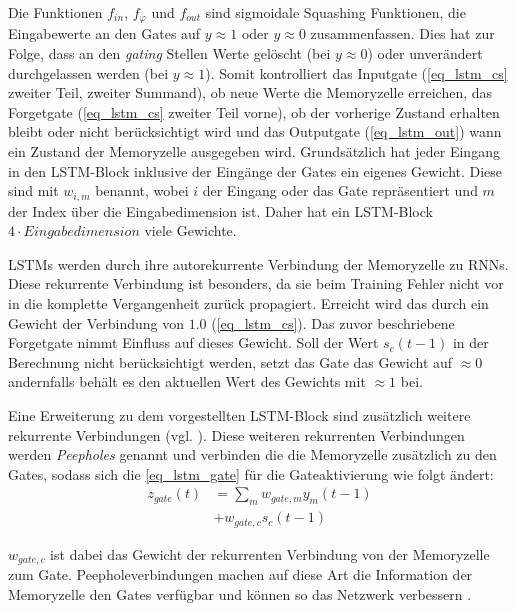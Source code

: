 Die Funktionen $f_{in}$, $f_{\varphi}$ und $f_{out}$ sind sigmoidale Squashing
Funktionen, die Eingabewerte an den Gates auf $y\approx1$ oder $y\approx0$
zusammenfassen. Dies hat zur Folge, dass an den \textit{gating} Stellen Werte
gelöscht (bei $y\approx0$) oder unverändert durchgelassen werden (bei
$y\approx1$). Somit kontrolliert das Inputgate (\autoref{eq_lstm_cs} zweiter
Teil, zweiter Summand), ob neue Werte die Memoryzelle erreichen, das Forgetgate
(\autoref{eq_lstm_cs} zweiter Teil vorne), ob der vorherige Zustand erhalten
bleibt oder nicht berücksichtigt wird und das Outputgate (\autoref{eq_lstm_out})
wann ein Zustand der Memoryzelle ausgegeben wird. Grundsätzlich hat jeder
Eingang in den \ac{LSTM}-Block inklusive der Eingänge der Gates ein eigenes
Gewicht. Diese sind mit $w_{i,m}$ benannt, wobei $i$ der Eingang oder das Gate
repräsentiert und $m$ der Index über die Eingabedimension ist. Daher hat ein
\ac{LSTM}-Block $4\cdot Eingabedimension$ viele Gewichte. 

\acp{LSTM} werden durch ihre autorekurrente Verbindung der Memoryzelle zu
\acp{RNN}. Diese rekurrente Verbindung ist besonders, da sie beim Training
Fehler nicht vor in die komplette Vergangenheit zurück propagiert. Erreicht wird
das durch ein Gewicht der Verbindung von $1.0$ (\autoref{eq_lstm_cs}). Das zuvor
beschriebene Forgetgate nimmt Einfluss auf dieses Gewicht. Soll der Wert
$s_c(t-1)$ in der Berechnung nicht berücksichtigt werden, setzt das Gate das
Gewicht auf $\approx0$ andernfalls behält es den aktuellen Wert des Gewichts mit
$\approx1$ bei. 

Eine Erweiterung zu dem vorgestellten \ac{LSTM}-Block sind zusätzlich weitere
rekurrente Verbindungen (vgl. \cite{Gers2002b}). Diese weiteren rekurrenten
Verbindungen werden \textit{Peepholes} genannt und verbinden die die Memoryzelle
zusätzlich zu den Gates, sodass sich die \autoref{eq_lstm_gate} für die Gateaktivierung
wie folgt ändert:
\begin{equation}
\label{eq_lstm_gate_peephole}
\begin{split}
z_{gate}(t) &= \sum \limits_{m} w_{gate,m}y_m(t-1) \\
			&+ w_{gate,c} s_c(t-1)
\end{split}
\end{equation}

$w_{gate,c}$ ist dabei das Gewicht der rekurrenten Verbindung von der
Memoryzelle zum Gate. Peepholeverbindungen machen auf diese Art die Information
der Memoryzelle den Gates verfügbar und können so das Netzwerk verbessern
\cite{Gers2002b}. 

